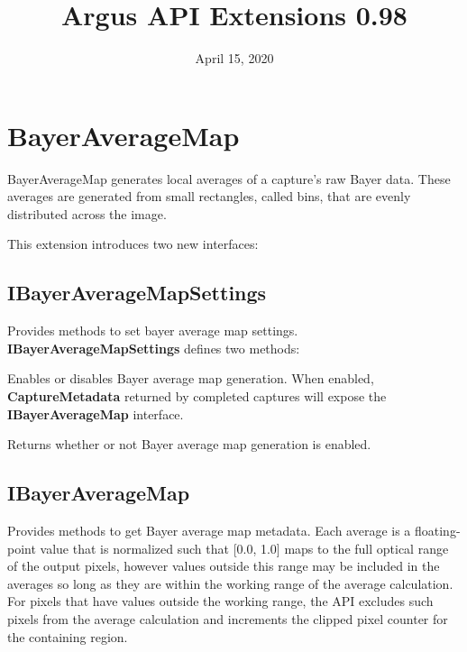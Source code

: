 \documentclass[11pt]{article}
\newcommand{\classname}[1]{\textbf{#1}}
\begin{document}
\title{Argus API Extensions 0.98}
\date{April 15, 2020}

\maketitle
\thispagestyle{empty}
\newpage
\tableofcontents
{}
\newpage
\listoftables

\newpage
{}
\section{BayerAverageMap}

BayerAverageMap generates local averages of a capture's raw Bayer data. These averages are
generated from small rectangles, called bins, that are evenly distributed across
the image.

This extension introduces two new interfaces:
\subsection{IBayerAverageMapSettings} Provides methods to set bayer average map settings.
\classname{IBayerAverageMapSettings} defines two methods:

\begin{description}[style=nextline,align=left,leftmargin=4em]
\item[setBayerAverageMapEnable()] Enables or disables Bayer average map generation.
When enabled, \classname{CaptureMetadata} returned by completed captures will expose the
\classname{IBayerAverageMap} interface.
\item[getBayerAverageMapEnable()] Returns whether or not Bayer average map generation is enabled.
\end{description}

\subsection{IBayerAverageMap} Provides methods to get Bayer average map metadata. Each average
is a floating-point value that is normalized such that [0.0, 1.0] maps to the full optical range
of the output pixels, however values outside this range may be included in the averages so long
as they are within the working range of the average calculation.
For pixels that have values outside the working range, the API excludes such pixels from the
average calculation and increments the clipped pixel counter for the containing region.
\end{document}
